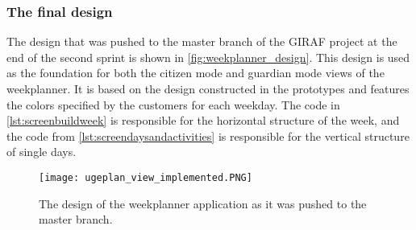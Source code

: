 \subsubsection{The final design}
The design that was pushed to the master branch of the GIRAF project at the end of the second sprint is shown in \autoref{fig:weekplanner_design}.
This design is used as the foundation for both the citizen mode and guardian mode views of the weekplanner.
It is based on the design constructed in the prototypes and features the colors specified by the customers for each weekday.
The code in \autoref{lst:screenbuildweek} is responsible for the horizontal structure of the week, and the code from \autoref{lst:screendaysandactivities} is responsible for the vertical structure of single days.


\begin{figure}[h!]
  \centering
  \texttt{[image: ugeplan\_view\_implemented.PNG]}
  \caption{The design of the weekplanner application as it was pushed to the master branch.}
  \label{fig:weekplanner_design}
\end{figure}